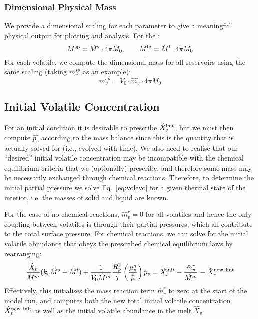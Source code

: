 \subsubsection{Dimensional Physical Mass}
We provide a dimensional scaling for each parameter to give a meaningful physical output for plotting and analysis.  For the :
\begin{equation}
M^{\rm sp} = \hat{M}^{\rm s} \cdot 4 \pi M_0, \qquad M^{\rm lp} = \hat{M}^{\rm l} \cdot 4 \pi M_0
\end{equation}
For each volatile, we compute the dimensional mass for all reservoirs using the same scaling (taking $m_v^{sp}$ as an example):
\begin{equation}
m_v^{sp} = V_0 \cdot \hat{m}_v^s \cdot 4 \pi M_0
\end{equation}
\subsection{Initial Volatile Concentration}
For an initial condition it is desirable to prescribe $\hat{X}_v^{\rm init}$, but we must then compute $\hat{p_v}$ according to the mass balance since this is the quantity that is actually solved for (i.e., evolved with time).  We also need to realise that our ``desired'' initial volatile concentration may be incompatible with the chemical equilibrium criteria that we (optionally) prescribe, and therefore some mass may be necessarily exchanged through chemical reactions.  Therefore, to determine the initial partial pressure we solve Eq.~\ref{eq:volevo} for a given thermal state of the interior, i.e. the masses of solid and liquid are known.

For the case of no chemical reactions, $\hat{m}_v^r=0$ for all volatiles and hence the only coupling between volatiles is through their partial pressures, which all contribute to the total surface pressure.  For chemical reactions, we can solve for the initial volatile abundance that obeys the prescribed chemical equilibrium laws by rearranging:
\begin{equation}
\frac{\hat{X}_v}{\hat{M}^m} (k_v \hat{M}^s + \hat{M}^l) + \frac{1}{V_0 \hat{M}^m} \frac{\hat{R}_p^2}{\hat{g}} \left( \frac{\hat{\mu}_v^g}{\hat{\bar{\mu}}} \right)\hat{p}_v = \hat{X}_v^{\rm init} - \frac{\hat{m}_v^r}{\hat{M}^m} \equiv \hat{X}_v^{\rm new\ init} 
\label{eq:volinit3}
\end{equation}
Effectively, this initialises the mass reaction term $\hat{m}^r_v$ to zero at the start of the model run, and computes both the new total initial volatile concentration $\hat{X}_v^{\rm new\ init}$ as well as the initial volatile abundance in the melt $\hat{X}_v$.  
